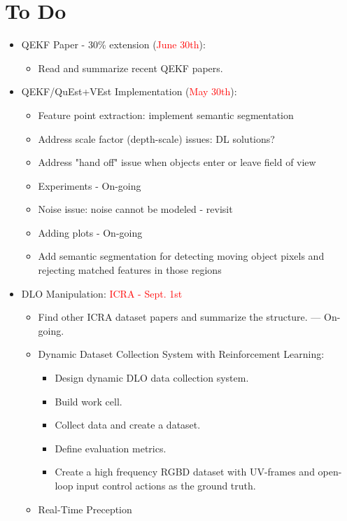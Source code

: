 \documentclass[11pt]{article}
\begin{document}
\section{To Do}
\begin{itemize}
  \item QEKF Paper - 30\% extension (\textcolor{red}{June 30th}):
  \begin{itemize}
      \item Read and summarize recent QEKF papers.
  \end{itemize}
  \item QEKF/QuEst+VEst Implementation (\textcolor{red}{May 30th}):
  \begin{itemize}
      \item Feature point extraction: implement semantic segmentation
      \item Address scale factor (depth-scale) issues: DL solutions?
      \item Address "hand off" issue when objects enter or leave field of view
      \item Experiments - On-going
      \item Noise issue: noise cannot be modeled - revisit
      \item Adding plots - On-going
      \item Add semantic segmentation for detecting moving object pixels and rejecting matched features in those regions
  \end{itemize}
  \item  DLO Manipulation:  \textcolor{red}{ICRA - Sept. 1st}
  \begin{itemize}
      \item Find other ICRA dataset papers and summarize the structure. --- On-going.
      \item Dynamic Dataset Collection System with Reinforcement Learning:
      \begin{itemize}
        \item Design dynamic DLO data collection system.
        \item Build work cell.
        \item Collect data and create a dataset.
        \item Define evaluation metrics.
        \item Create a high frequency RGBD dataset with UV-frames and open-loop input control actions as the ground truth.
      \end{itemize}
      \item Real-Time Preception

\end{itemize}
\end{itemize}
\end{document}
